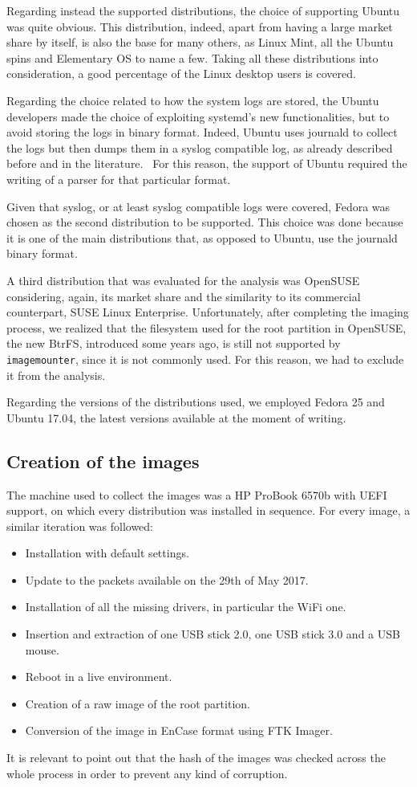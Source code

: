 \documentclass[a4paper]{article}
\begin{document}
Regarding instead the supported distributions, the choice of supporting Ubuntu
was quite obvious. This distribution, indeed, apart from having a large market
share by itself, is also the base for many others, as Linux Mint, all the Ubuntu
spins and Elementary OS to name a few. Taking all these distributions into
consideration, a good percentage of the Linux desktop users is covered.

Regarding the choice related to how the system logs are stored, the Ubuntu
developers made the choice of exploiting systemd's new functionalities, but to
avoid storing the logs in binary format. Indeed, Ubuntu uses journald to collect
the logs but then dumps them in a syslog compatible log, as already described
before and in the literature.~\cite{patil2016digital} For this reason, the
support of Ubuntu required the writing of a parser for that particular format.

Given that syslog, or at least syslog compatible logs were covered, Fedora was
chosen as the second distribution to be supported. This choice was done because
it is one of the main distributions that, as opposed to Ubuntu, use the
journald binary format.

A third distribution that was evaluated for the analysis was OpenSUSE
considering, again, its market share and the similarity to its commercial
counterpart, SUSE Linux Enterprise. Unfortunately, after completing the imaging
process, we realized that the filesystem used for the root partition in
OpenSUSE, the new BtrFS, introduced some years ago, is still not supported by
\texttt{imagemounter}, since it is not commonly used. For this reason, we had to
exclude it from the analysis.

Regarding the versions of the distributions used, we employed Fedora 25 and
Ubuntu 17.04, the latest versions available at the moment of writing.

\subsection{Creation of the images}
\label{sec:images}
The machine used to collect the images was a HP ProBook 6570b with UEFI
support, on which every distribution was installed in sequence. For every
image, a similar iteration was followed:
\begin{itemize}
\item Installation with default settings.
\item Update to the packets available on the 29th of May 2017.
\item Installation of all the missing drivers, in particular the WiFi one.
\item Insertion and extraction of one USB stick 2.0, one USB stick 3.0 and a USB
	mouse.
\item Reboot in a live environment.
\item Creation of a raw image of the root partition.
\item Conversion of the image in EnCase format using FTK Imager.
\end{itemize}
It is relevant to point out that the hash of the images was checked across the
whole process in order to prevent any kind of corruption.
\end{document}
